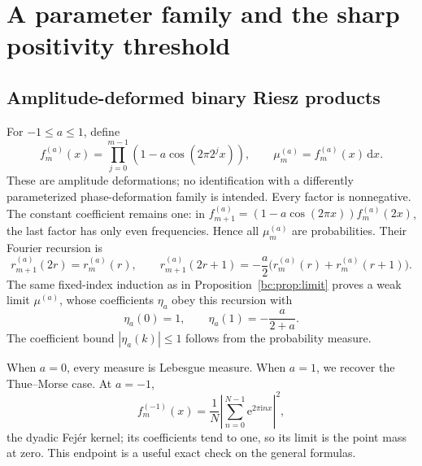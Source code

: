 \documentclass[11pt,a4paper,oneside,openany]{book}
\numberwithin{equation}{chapter}
\theoremstyle{definition}
\theoremstyle{remark}
\newcommand{\dd}{\,\mathrm d}
\newcommand{\ee}{\mathrm e}
\newcommand{\ii}{\mathrm i}
\begin{document}
\chapter{A parameter family and the sharp positivity threshold}
\label{bc:sec:parameter}

\section{Amplitude-deformed binary Riesz products}
For $-1\le a\le1$, define
\begin{equation}
 f_m^{(a)}(x)=\prod_{j=0}^{m-1}(1-a\cos(2\pi2^jx)),\qquad
 \mu_m^{(a)}=f_m^{(a)}(x)\dd x.
 \label{bc:eq:parameter-product}
\end{equation}
These are amplitude deformations; no identification with a differently
parameterized phase-deformation family is intended. Every factor is nonnegative.
The constant coefficient remains one: in
$f_{m+1}^{(a)}=(1-a\cos(2\pi x))f_m^{(a)}(2x)$, the last factor has only even
frequencies. Hence all $\mu_m^{(a)}$ are probabilities. Their Fourier recursion is
\begin{equation}
 r_{m+1}^{(a)}(2r)=r_m^{(a)}(r),\qquad
 r_{m+1}^{(a)}(2r+1)=-\frac a2\bigl(r_m^{(a)}(r)+r_m^{(a)}(r+1)\bigr).
 \label{bc:eq:parameter-rec}
\end{equation}
The same fixed-index induction as in Proposition~\ref{bc:prop:limit} proves a weak
limit $\mu^{(a)}$, whose coefficients $\eta_a$ obey this recursion with
\begin{equation}
 \eta_a(0)=1,\qquad \eta_a(1)=-\frac a{2+a}.
 \label{bc:eq:parameter-eta}
\end{equation}
The coefficient bound $|\eta_a(k)|\le1$ follows from the probability measure.

When $a=0$, every measure is Lebesgue measure. When $a=1$, we recover the
Thue--Morse case. At $a=-1$,
\begin{equation}
 f_m^{(-1)}(x)=\frac1N\left|\sum_{n=0}^{N-1}\ee^{2\pi\ii nx}\right|^2,
 \label{bc:eq:Fejer}
\end{equation}
the dyadic Fej\'er kernel; its coefficients tend to one, so its limit is the point
mass at zero. This endpoint is a useful exact check on the general formulas.
\end{document}
